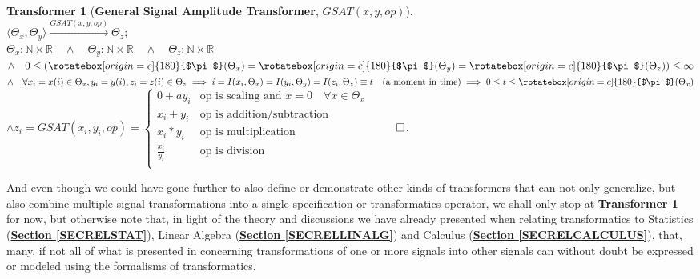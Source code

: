 \documentclass[a4paper, 18pt]{book} %
\newtheorem{transf}{Transformer}
\newcommand{\invpi}{\rotatebox[origin=c]{180}{$\pi$}}
\begin{document}
\begin{appendices}
\begin{transf}[\textbf{General Signal Amplitude Transformer}, $GSAT(x, y,op)$]
\label{TRANSFGSATSIG}
$ $\\
$\langle \Theta_x, \Theta_y \rangle \xrightarrow{GSAT(x, y,op)} \Theta_z;$\\
$\Theta_x : \mathbb{N} \times \mathbb{R} \quad \land \quad \Theta_y: \mathbb{N} \times \mathbb{R} \quad \land \quad \Theta_z: \mathbb{N} \times \mathbb{R}$\\
$\land \quad 0 \leq (\invpi(\Theta_x) = \invpi(\Theta_y) = \invpi(\Theta_z)) \leq \infty$\\
$\land \quad \forall x_i=x(i) \in \Theta_x, y_i=y(i), z_i=z(i) \in \Theta_z \implies i = I(x_i,\Theta_x) = I(y_i,\Theta_y) = I(z_i,\Theta_z) \equiv t \quad \text{(a moment in time)} \implies 0 \leq t \leq \invpi(\Theta_x)$\\
$\land z_i = GSAT(x_i, y_i,op) = \begin{cases}
0 + ay_i & \text{op is scaling and } x = 0 \quad \forall x \in \Theta_x\\
x_i \pm y_i & \text{op is addition/subtraction}\\
x_i * y_i & \text{op is multiplication}\\
\frac{x_i}{y_i} & \text{op is division}\\
\end{cases}$
$\qed$.
\end{transf}


\vspace{2em}


And even though we could have gone further to also define or demonstrate other kinds of transformers that can not only generalize, but also combine multiple signal transformations into a single specification or transformatics operator, we shall only stop at \textbf{\hyperref[TRANSFGSATSIG]{Transformer \ref{TRANSFGSATSIG}}} for now, but otherwise note that, in light of the theory and discussions we have already presented when relating transformatics to Statistics (\textbf{\hyperref[SECRELSTAT]{Section \ref{SECRELSTAT}}}), Linear Algebra (\textbf{\hyperref[SECRELLINALG]{Section \ref{SECRELLINALG}}}) and Calculus (\textbf{\hyperref[SECRELCALCULUS]{Section \ref{SECRELCALCULUS}}}), that, many, if not all of what is presented in \cite{Wang2012} concerning transformations of one or more signals into other signals can without doubt be expressed or modeled using the formalisms of transformatics. 

\vspace{2em}


\end{appendices}
\end{document}
